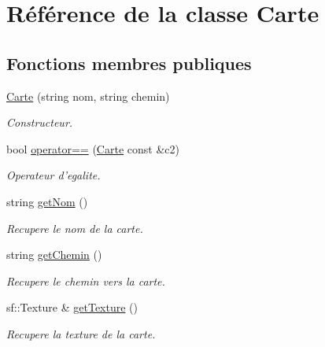 \hypertarget{classCarte}{\section{\-Référence de la classe \-Carte}
\label{classCarte}
}
\subsection*{\-Fonctions membres publiques}
\begin{DoxyCompactItemize}
\item 
\hypertarget{classCarte_a51771441eb54aa18eb62005e2933eca3}{\hyperlink{classCarte_a51771441eb54aa18eb62005e2933eca3}{\-Carte} (string nom, string chemin)}\label{classCarte_a51771441eb54aa18eb62005e2933eca3}

\begin{DoxyCompactList}\small\item\em \-Constructeur. \end{DoxyCompactList}\item 
bool \hyperlink{classCarte_a9d9aa4e925a54cf0b830c6d34fea4ad7}{operator==} (\hyperlink{classCarte}{\-Carte} const \&c2)
\begin{DoxyCompactList}\small\item\em \-Operateur d'egalite. \end{DoxyCompactList}\item 
string \hyperlink{classCarte_a3650c2d0ea9877fe29f4673f430daa8e}{get\-Nom} ()
\begin{DoxyCompactList}\small\item\em \-Recupere le nom de la carte. \end{DoxyCompactList}\item 
string \hyperlink{classCarte_a1a252f29ea6970a8aa72ec7739a13101}{get\-Chemin} ()
\begin{DoxyCompactList}\small\item\em \-Recupere le chemin vers la carte. \end{DoxyCompactList}\item 
sf\-::\-Texture \& \hyperlink{classCarte_a813a8fc1e11e43b7f2374c6e1ce77c26}{get\-Texture} ()
\begin{DoxyCompactList}\small\item\em \-Recupere la texture de la carte. \end{DoxyCompactList}\end{DoxyCompactItemize}


